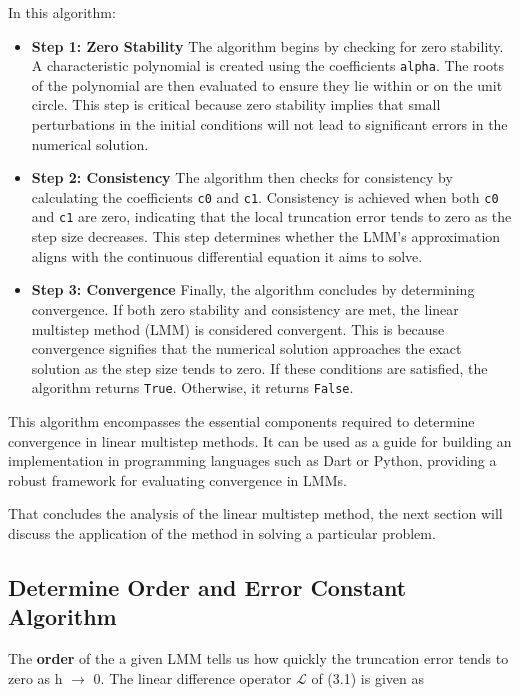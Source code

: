    In this algorithm:

\begin{itemize}
  \item \textbf{Step 1: Zero Stability} 
  The algorithm begins by checking for zero stability. A characteristic polynomial is created using the coefficients \texttt{alpha}. The roots of the polynomial are then evaluated to ensure they lie within or on the unit circle. This step is critical because zero stability implies that small perturbations in the initial conditions will not lead to significant errors in the numerical solution.

  \item \textbf{Step 2: Consistency} 
  The algorithm then checks for consistency by calculating the coefficients \texttt{c0} and \texttt{c1}. Consistency is achieved when both \texttt{c0} and \texttt{c1} are zero, indicating that the local truncation error tends to zero as the step size decreases. This step determines whether the LMM's approximation aligns with the continuous differential equation it aims to solve.

  \item \textbf{Step 3: Convergence} 
  Finally, the algorithm concludes by determining convergence. If both zero stability and consistency are met, the linear multistep method (LMM) is considered convergent. This is because convergence signifies that the numerical solution approaches the exact solution as the step size tends to zero. If these conditions are satisfied, the algorithm returns \texttt{True}. Otherwise, it returns \texttt{False}.

\end{itemize}

This algorithm encompasses the essential components required to determine convergence in linear multistep methods. It can be used as a guide for building an implementation in programming languages such as Dart or Python, providing a robust framework for evaluating convergence in LMMs.


That concludes the analysis of the linear multistep method, the next section will discuss the application of the method in solving a particular problem.



\subsection{Determine Order and Error Constant Algorithm}

The \textbf{order} of the a given LMM tells us how quickly the truncation error tends to zero as h $\to$ 0. The linear difference operator $\mathcal{L}$ of (3.1) is given as

